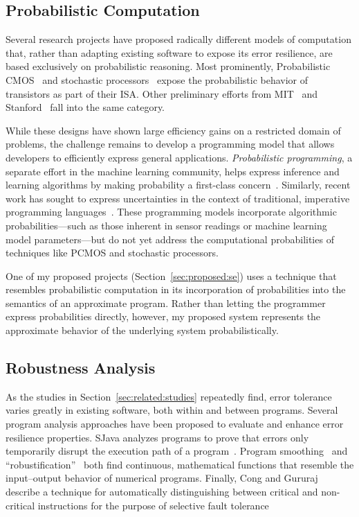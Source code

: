 \subsection{Probabilistic Computation}

Several research projects have proposed radically different models of
computation that, rather than adapting existing software to expose its error
resilience, are based exclusively on probabilistic reasoning. Most
prominently, Probabilistic CMOS~\cite{pcmos, pcmos-cacm, palem-dac-position}
and stochastic processors~\cite{stochasticproc} expose the probabilistic
behavior of transistors as part of their ISA.
Other preliminary efforts from MIT~\cite{batesmit, lyric, mansinghka-circuits} and
Stanford~\cite{ersa} fall into the same category.

While these designs have shown large efficiency gains on a restricted domain
of problems, the challenge remains to develop a programming model that allows
developers to efficiently express general applications. \emph{Probabilistic
programming}, a separate effort in the machine learning community, helps
express inference and learning algorithms by making probability a first-class
concern~\cite{church}. Similarly, recent work has sought to express
uncertainties in the context of traditional, imperative programming
languages~\cite{uncertaint}. These programming models incorporate algorithmic
probabilities---such as those inherent in sensor readings or machine learning
model parameters---but do not yet address the computational probabilities of
techniques like PCMOS and stochastic processors.

One of my proposed projects (Section~\ref{sec:proposed:se}) uses a technique
that resembles probabilistic computation in its incorporation of probabilities
into the semantics of an approximate program. Rather than letting the
programmer express probabilities directly, however, my proposed system
represents the approximate behavior of the underlying system
probabilistically.


\subsection{Robustness Analysis}

As the studies in Section~\ref{sec:related:studies} repeatedly find, error
tolerance varies greatly in existing software, both within and between
programs. Several program analysis approaches have been proposed to evaluate
and enhance error resilience properties. SJava analyzes programs to prove that
errors only temporarily disrupt the execution path of a program~\cite{sjava}.
Program smoothing~\cite{smoothing-cav, smoothing-pldi, smoothing-fse} and
``robustification''~\cite{robustification} both find continuous, mathematical
functions that resemble the input--output behavior of numerical programs.
Finally, Cong and Gururaj describe a technique for automatically
distinguishing between critical and non-critical instructions for the purpose
of selective fault tolerance~\cite{cong-iccad}





